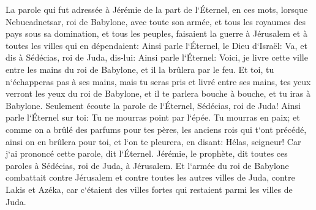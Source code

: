 \verse La parole qui fut adressée à Jérémie de la part de l`Éternel, en ces mots, lorsque Nebucadnetsar, roi de Babylone, avec toute son armée, et tous les royaumes des pays sous sa domination, et tous les peuples, faisaient la guerre à Jérusalem et à toutes les villes qui en dépendaient: 
\verse Ainsi parle l`Éternel, le Dieu d`Israël: Va, et dis à Sédécias, roi de Juda, dis-lui: Ainsi parle l`Éternel: Voici, je livre cette ville entre les mains du roi de Babylone, et il la brûlera par le feu. 
\verse Et toi, tu n`échapperas pas à ses mains, mais tu seras pris et livré entre ses mains, tes yeux verront les yeux du roi de Babylone, et il te parlera bouche à bouche, et tu iras à Babylone. 
\verse Seulement écoute la parole de l`Éternel, Sédécias, roi de Juda! Ainsi parle l`Éternel sur toi: Tu ne mourras point par l`épée. 
\verse Tu mourras en paix; et comme on a brûlé des parfums pour tes pères, les anciens rois qui t`ont précédé, ainsi on en brûlera pour toi, et l`on te pleurera, en disant: Hélas, seigneur! Car j`ai prononcé cette parole, dit l`Éternel. 
\verse Jérémie, le prophète, dit toutes ces paroles à Sédécias, roi de Juda, à Jérusalem. 
\verse Et l`armée du roi de Babylone combattait contre Jérusalem et contre toutes les autres villes de Juda, contre Lakis et Azéka, car c`étaient des villes fortes qui restaient parmi les villes de Juda. 
